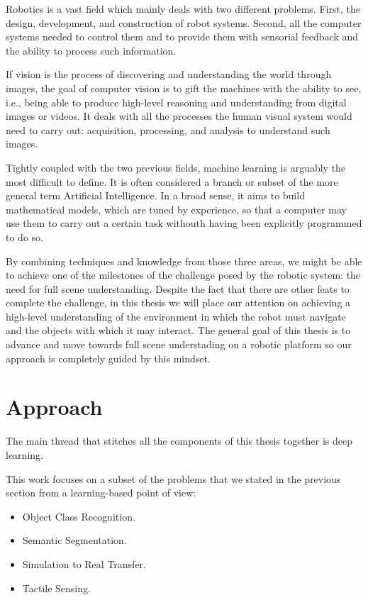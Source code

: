Robotics is a vast field which mainly deals with two different problems. First, the design, development, and construction of robot systems. Second, all the computer systems needed to control them and to provide them with sensorial feedback and the ability to process such information.

If vision is the process of discovering and understanding the world through images, the goal of computer vision is to gift the machines with the ability to see, i.e., being able to produce high-level reasoning and understanding from digital images or videos. It deals with all the processes the human visual system would need to carry out: acquisition, processing, and analysis to understand such images.

Tightly coupled with the two previous fields, machine learning is arguably the most difficult to define. It is often considered a branch or subset of the more general term Artificial Intelligence. In a broad sense, it aims to build mathematical models, which are tuned by experience, so that a computer may use them to carry out a certain task withouth having been explicitly programmed to do so.

By combining techniques and knowledge from those three areas, we might be able to achieve one of the milestones of the challenge posed by the robotic system: the need for full scene understanding. Despite the fact that there are other feats to complete the challenge, in this thesis we will place our attention on achieving a high-level understanding of the environment in which the robot must navigate and the objects with which it may interact. The general goal of this thesis is to advance and move towards full scene understading on a robotic platform so our approach is completely guided by this mindset.

\section{Approach}
\label{cha:introduction:sec:approach}

The main thread that stitches all the components of this thesis together is deep learning.

This work focuses on a subset of the problems that we stated in the previous section from a learning-based point of view:

\begin{itemize}
    \item Object Class Recognition.
    \item Semantic Segmentation.
    \item Simulation to Real Transfer.
    \item Tactile Sensing.
\end{itemize}

